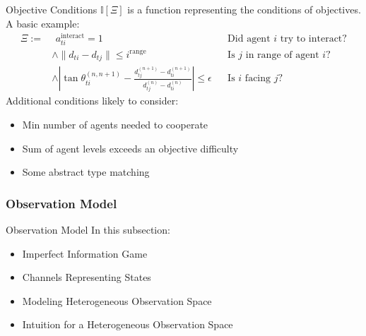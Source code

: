 \begin{frame}{Objective Conditions}
    \(\mathbb{I}[\Xi]\) is a function representing the conditions of objectives.
    A basic example:
    \begin{align*}
        \Xi := &\,\ a_{ti}^\text{interact} = 1 && \text{Did agent \(i\) try to interact?} \\ 
        & \land \|d_{ti}-d_{tj}\| \leq i^\text{range} &&\text{Is \(j\) in range of agent \(i\)?}\\
        & \land \left| \tan\theta_{ti}^{(n,n+1)} 
            - \frac{d_{tj}^{(n+1)}-d_{ti}^{(n+1)}}{d_{tj}^{(n)}-d_{ti}^{(n)}} \right| 
            \leq \epsilon && \text{Is \(i\) facing \(j\)?}
    \end{align*}
    Additional conditions likely to consider:
    \begin{itemize}
        \item Min number of agents needed to cooperate
        \item Sum of agent levels exceeds an objective difficulty
        \item Some abstract type matching
    \end{itemize}
\end{frame}

\subsubsection{Observation Model}

\begin{frame}{Observation Model}
    In this subsection:
    \begin{itemize}
        \item Imperfect Information Game
        \item Channels Representing States
        \item Modeling Heterogeneous Observation Space
        \item Intuition for a Heterogeneous Observation Space
    \end{itemize}
\end{frame}


